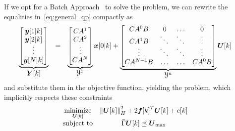 \documentclass[../main.tex]{subfiles}
\begin{document}
If we opt for a Batch Approach~\cite[Chapter 8.2]{BorrelliEtAl2017} to solve the problem, we can rewrite the equalities in~\eqref{eq:general_qp} compactly as
\begin{equation}
    \begin{matrix}
      \underbrace{
        \left[
          \begin{matrix}
            \vec{y}[1|k] \\
            \vec{y}[2|k] \\
            \vdots \\
            \vec{y}[\predhorz|k]
          \end{matrix}
        \right]
      }_{\textstyle \vec{Y}[k]} &=&
      \underbrace{
        \left[
          \begin{matrix}
            CA^{1} \\
            CA^{2} \\
            \vdots \\
            CA^{\predhorz}
          \end{matrix}
        \right]
      }_{\textstyle \mathcal{Y}^{x}}
      \vec{x}[0|k]+
      \underbrace{
        \left[
          \begin{matrix}
            CA^{0}B & 0 & \dots & 0 \\
            CA^{1}B& \ddots & \ddots & \vdots      \\
            \vdots     & \ddots   & \ddots & \vdots    \\
            CA^{\predhorz-1}B & \dots & \dots & CA^{0}B
          \end{matrix}
        \right]
      }_{\textstyle \mathcal{Y}^{u}}
      \vec{U}[k]
    \end{matrix}
    \quad
\end{equation}
and substitute them in the objective function, yielding the \qp{} problem, which implicitly respects these constraints
\begin{equation}
  \label{eq:quadratic_objective_compact_batch}
  \begin{aligned}
    \begin{matrix}
      \mathop{\textrm{minimize}}\limits_{\boldsymbol{U}[k]} &
      \left\lVert\boldsymbol{U}[k]\right\rVert^{2}_{H} + 2{\boldsymbol{f}[k]}^{T}\boldsymbol{U}[k] + c[k] &\\
      \mathrm{subject~ to} &
\bar{\Gamma}\boldsymbol{U}[k]\preceq {\boldsymbol{U}}_{\text{max}}
    \end{matrix}
  \end{aligned}
\end{equation}
\end{document}
